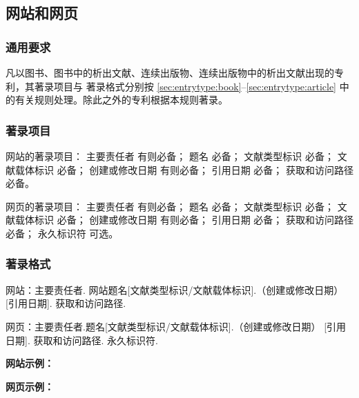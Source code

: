 \documentclass[twoside]{article}%
\begin{document}
\subsection{网站和网页}

\subsubsection{通用要求}

凡以图书、图书中的析出文献、连续出版物、连续出版物中的析出文献出现的专利，其著录项目与
著录格式分别按 \ref{sec:entrytype:book}--\ref{sec:entrytype:article} 中的有关规则处理。除此之外的专利根据本规则著录。

\subsubsection{著录项目}

网站的著录项目：
主要责任者 有则必备；
题名 必备；
文献类型标识 必备；
文献载体标识 必备；
创建或修改日期 有则必备；
引用日期 必备；
获取和访问路径 必备。

网页的著录项目：
主要责任者 有则必备；
题名 必备；
文献类型标识 必备；
文献载体标识 必备；
创建或修改日期 有则必备；
引用日期 必备；
获取和访问路径 必备；
永久标识符 可选。

\subsubsection{著录格式}

网站：主要责任者. 网站题名[文献类型标识/文献载体标识].（创建或修改日期） [引用日期]. 获取和访问路径.

网页：主要责任者.题名[文献类型标识/文献载体标识].（创建或修改日期） [引用日期]. 获取和访问路径. 永久标识符.


\begin{refsection}

\nocite{鲁迅博物馆2023,
BBC2020a,
BBC2020b}


{


\textbf{网站示例：}

{\printbibliography[heading=none,env=indentegenv]}
}
\end{refsection}

\begin{refsection}

\nocite{北京市人民政府办公厅2005--,鲁迅博物馆2021,
杨立华2022,ISOHOME2020,ANTONIO2019,BEVINGTON2025,昨日之歌2015,
Zotero2024,仉尚航2024}


{


\textbf{网页示例：}

{\printbibliography[heading=none,env=indentegenv]}
}
\end{refsection}
\end{document}
